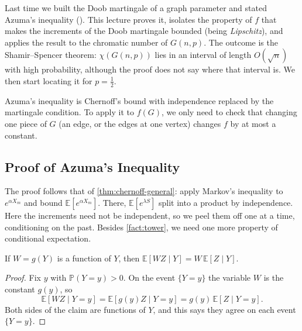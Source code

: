
Last time we built the Doob martingale of a graph parameter and stated Azuma's inequality (). This lecture proves it, isolates the property of \(f\) that makes the increments of the Doob martingale bounded (being \emph{Lipschitz}), and applies the result to the chromatic number of \(G(n,p)\). The outcome is the Shamir--Spencer theorem: \(\chi(G(n,p))\) lies in an interval of length \(O(\sqrt{n})\) with high probability, although the proof does not say where that interval is. We then start locating it for \(p = \frac{1}{2}\).

\begin{moral}
    Azuma's inequality is Chernoff's bound with independence replaced by the martingale condition. To apply it to \(f(G)\), we only need to check that changing one piece of \(G\) (an edge, or the edges at one vertex) changes \(f\) by at most a constant.
\end{moral}

\subsection{Proof of Azuma's Inequality}\label{sec:azuma-proof}

The proof follows that of \autoref{thm:chernoff-general}: apply Markov's inequality to \(e^{\alpha X_{m}}\) and bound \(\mathbb{E}[e^{\alpha X_{m}}]\). There, \(\mathbb{E}[e^{\lambda S}]\) split into a product by independence. Here the increments need not be independent, so we peel them off one at a time, conditioning on the past. Besides \autoref{fact:tower}, we need one more property of conditional expectation.

\begin{fact}\label{fact:take-out}
    If \(W = g(Y)\) is a function of \(Y\), then \(\mathbb{E}[W Z \mid Y] = W \, \mathbb{E}[Z \mid Y]\).
\end{fact}

\begin{proof}
    Fix \(y\) with \(\mathbb{P}(Y = y) > 0\). On the event \(\{ Y = y \}\) the variable \(W\) is the constant \(g(y)\), so
    \[
        \mathbb{E}[W Z \mid Y = y] = \mathbb{E}[g(y) Z \mid Y = y] = g(y) \, \mathbb{E}[Z \mid Y = y] .
    \]
    Both sides of the claim are functions of \(Y\), and this says they agree on each event \(\{ Y = y \}\).
\end{proof}

